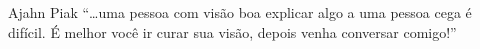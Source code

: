 
\begin{quotepage}{0.51\linewidth}{Ajahn Piak}
“\ldots{}uma pessoa com visão boa explicar algo a uma pessoa cega é difícil. É
melhor você ir curar sua visão, depois venha conversar comigo!”
\end{quotepage}

